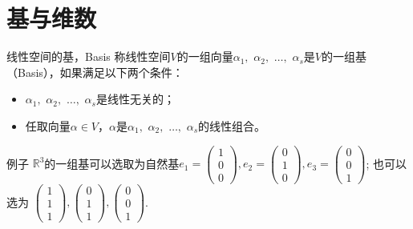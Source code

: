 \documentclass[10pt]{beamer}
\begin{document}
\section{基与维数}


\begin{frame}

\begin{block}{线性空间的基，Basis}
称线性空间$V$的一组向量$\alpha_1,$ $\alpha_2,$ $\ldots,$ $\alpha_s$是$V$的一组基（Basis），如果满足以下两个条件：
\begin{itemize}
\item $\alpha_1,$ $\alpha_2,$ $\ldots,$ $\alpha_s$是线性无关的；
\item 任取向量$\alpha\in V$，$\alpha$是$\alpha_1,$ $\alpha_2,$ $\ldots,$ $\alpha_s$的线性组合。
\end{itemize}
\end{block}

\pause

\begin{block}{例子}
$\mathbb{R}^3$的一组基可以选取为自然基\(\displaystyle e_1 = \begin{pmatrix} 1 \\ 0 \\ 0 \end{pmatrix}, e_2 = \begin{pmatrix} 0 \\ 1 \\ 0 \end{pmatrix}, e_3 = \begin{pmatrix} 0 \\ 0 \\ 1 \end{pmatrix}\); \newline
\pause
也可以选为
\(\displaystyle \begin{pmatrix} 1 \\ 1 \\ 1 \end{pmatrix}, \begin{pmatrix} 0 \\ 1 \\ 1 \end{pmatrix}, \begin{pmatrix} 0 \\ 0 \\ 1 \end{pmatrix}\).
\end{block}

\end{frame}
\end{document}
